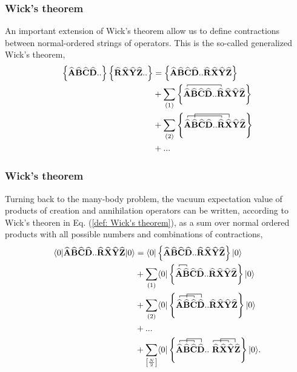 \documentclass{beamer}
\newcommand*{\for}[3]{\langle#1|#2|#3\rangle}
\newcommand*{\kpr}[1]{\left\{#1\right\}}
\newcommand{\OP}[1]{{\bf\widehat{#1}}}
\newcommand*{\fpr}[1]{\left[#1\right]}
\newcommand*{\pr}[1]{\left(#1\right)}
\begin{document}
\frame
{
  \frametitle{Wick's theorem}
\begin{small}
{\scriptsize
An important extension of Wick's theorem allow us to define contractions between normal-ordered strings of operators. This is the so-called generalized Wick's theorem,
\begin{align}
\label{def: Generalized Wick's theorem}
\kpr{\OP{A}\OP{B}\OP{C}\OP{D}..}\kpr{\OP{R}\OP{X}\OP{Y}\OP{Z}..} &= \kpr{\OP{A}\OP{B}\OP{C}\OP{D}..\OP{R}\OP{X}\OP{Y}\OP{Z}}\\
&+ \sum_{\pr{1}} \kpr{ 
\contraction[0.5ex]{}{\OP{A}}{\OP{B}\OP{C}\OP{D}..}{\OP{R}} \OP{A}\OP{B}\OP{C}\OP{D}..\OP{R}\OP{X}\OP{Y}\OP{Z}}\\
&+ \sum_{\pr{2}} \kpr{\contraction[0.5ex]{}{\OP{A}}{\OP{B}\OP{C}\OP{D}..}{\OP{R}}\contraction[1.0ex]{\OP{A}}{\OP{B}}{\OP{C}\OP{D}..\OP{R}}{\OP{X}}\OP{A}\OP{B}\OP{C}\OP{D}..\OP{R}\OP{X}\OP{Y}\OP{Z}}\\
&+ ...
\end{align}
}
\end{small}
}

\frame
{
  \frametitle{Wick's theorem}
\begin{small}
{\scriptsize
Turning back to the many-body problem, the vacuum expectation value of products of creation and annihilation operators can be written, according to Wick's theoren in Eq. (\ref{def: Wick's theorem}), as a sum over normal ordered products with all possible numbers and combinations of contractions,
\begin{align}
\for{0}{\OP{A}\OP{B}\OP{C}\OP{D}..\OP{R}\OP{X}\OP{Y}\OP{Z}}{0} &= \for{0}{\kpr{\OP{A}\OP{B}\OP{C}\OP{D}..\OP{R}\OP{X}\OP{Y}\OP{Z}}}{0}\\
&+ \sum_{\pr{1}} \for{0}{\kpr{\contraction[0.5ex]{}{\OP{A}}{}{\OP{B}} \OP{A}\OP{B}\OP{C}\OP{D}..\OP{R}\OP{X}\OP{Y}\OP{Z}}}{0}\\
&+ \sum_{\pr{2}}\for{0}{\kpr{\contraction[0.5ex]{}{\OP{A}}{\OP{B}}{\OP{C}}\contraction[1.0ex]{\OP{A}}{\OP{B}}{\OP{C}}{\OP{D}}\OP{A}\OP{B}\OP{C}\OP{D}..\OP{R}\OP{X}\OP{Y}\OP{Z}}}{0}\\
&+ ... \\
&+ \sum_{\fpr{\frac{N}{2}}} \for{0}{\kpr{\contraction[0.5ex]{}{\OP{A}}{\OP{B}}{\OP{C}}\contraction[1.0ex]{\OP{A}}{\OP{B}}{\OP{C}}{\OP{D}} \OP{A}\OP{B}\OP{C}\OP{D}..\contraction[0.5ex]{}{\OP{R}}{\OP{X}}{\OP{Y}}\contraction[1.0ex]{\OP{R}}{\OP{X}}{\OP{Y}}{\OP{Z}}\ \OP{R}\OP{X}\OP{Y}\OP{Z}}}{0}.
\end{align}
}
\end{small}
}
\end{document}
